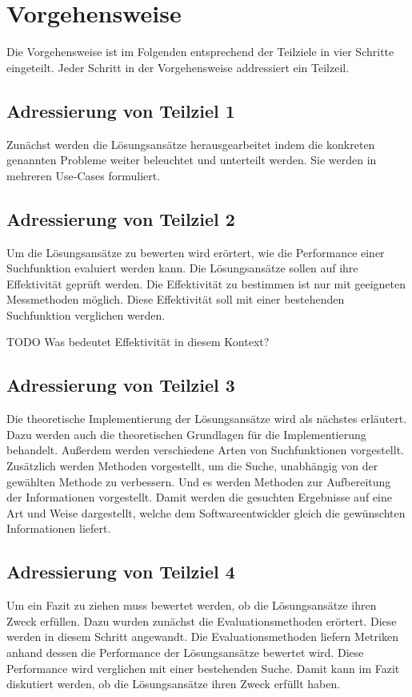 \section{Vorgehensweise}
Die Vorgehensweise ist im Folgenden entsprechend der Teilziele in vier Schritte eingeteilt.
Jeder Schritt in der Vorgehensweise addressiert ein Teilzeil. 

\subsection*{Adressierung von Teilziel 1}
Zunächst werden die Lösungsansätze herausgearbeitet indem die konkreten genannten Probleme weiter beleuchtet und unterteilt werden.
Sie werden in mehreren Use-Cases formuliert.

\subsection*{Adressierung von Teilziel 2}
Um die Lösungsansätze zu bewerten wird erörtert, wie die Performance einer Suchfunktion evaluiert werden kann.
Die Lösungsansätze sollen auf ihre Effektivität geprüft werden.
Die Effektivität zu bestimmen ist nur mit geeigneten Messmethoden möglich.
Diese Effektivität soll mit einer bestehenden Suchfunktion verglichen werden.

TODO Was bedeutet Effektivität in diesem Kontext?

\subsection*{Adressierung von Teilziel 3}
Die theoretische Implementierung der Lösungsansätze wird als nächstes erläutert.
Dazu werden auch die theoretischen Grundlagen für die Implementierung behandelt.
Außerdem werden verschiedene Arten von Suchfunktionen vorgestellt.
Zusätzlich werden Methoden vorgestellt, um die Suche, unabhängig von der gewählten Methode zu verbessern.
Und es werden Methoden zur Aufbereitung der Informationen vorgestellt.
Damit werden die gesuchten Ergebnisse auf eine Art und Weise dargestellt, welche dem Softwareentwickler gleich die gewünschten Informationen liefert.

\subsection*{Adressierung von Teilziel 4}
Um ein Fazit zu ziehen muss bewertet werden, ob die Lösungsansätze ihren Zweck erfüllen.
Dazu wurden zunächst die Evaluationsmethoden erörtert.
Diese werden in diesem Schritt angewandt.
Die Evaluationsmethoden liefern Metriken anhand dessen die Performance der Lösungsansätze bewertet wird.
Diese Performance wird verglichen mit einer bestehenden Suche.
Damit kann im Fazit diskutiert werden, ob die Lösungsansätze ihren Zweck erfüllt haben.

